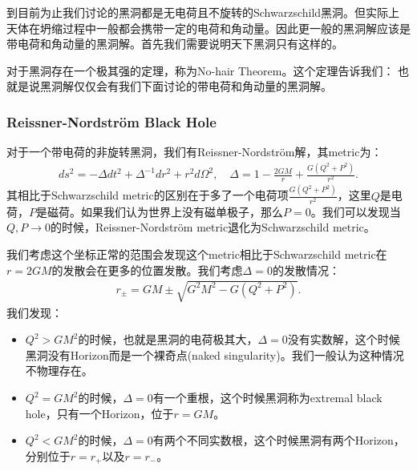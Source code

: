 到目前为止我们讨论的黑洞都是无电荷且不旋转的Schwarzschild黑洞。但实际上天体在坍缩过程中一般都会携带一定的电荷和角动量。因此更一般的黑洞解应该是带电荷和角动量的黑洞解。首先我们需要说明天下黑洞只有这样的。

\bigskip
{}

对于黑洞存在一个极其强的定理，称为No-hair Theorem。这个定理告诉我们：
也就是说黑洞解仅仅会有我们下面讨论的带电荷和角动量的黑洞解。

\subsubsection{Reissner-Nordström Black Hole}

\bigskip
{}

对于一个带电荷的非旋转黑洞，我们有Reissner-Nordström解，其metric为：
\begin{align}
  ds^2=-\Delta
  dt^2+\Delta^{-1}dr^2+r^2d\Omega^2,\quad\Delta=1-\frac{2GM}{r}+\frac{G(Q^2+P^2)}{r^2}.
\end{align}
其相比于Schwarzschild metric的区别在于多了一个电荷项$ \frac{G(Q^2+P^2)}{r^2} $，这里$ Q
$是电荷，$ P $是磁荷。如果我们认为世界上没有磁单极子，那么$ P=0 $。我们可以发现当$ Q,P \to 0
$的时候，Reissner-Nordström metric退化为Schwarzschild metric。

\bigskip
{}

我们考虑这个坐标正常的范围会发现这个metric相比于Schwarzschild metric在$ r = 2GM
$的发散会在更多的位置发散。我们考虑$ \Delta = 0 $的发散情况：
\begin{align}
  r_\pm=GM\pm\sqrt{G^2M^2-G(Q^2+P^2)}.
\end{align}
我们发现：
\begin{itemize}
  \item $ Q^2 > GM^2 $的时候，也就是黑洞的电荷极其大，$ \Delta = 0
    $没有实数解，这个时候黑洞没有Horizon而是一个裸奇点(naked singularity)。我们一般认为这种情况不物理存在。
  \item $ Q^2 = GM^2 $的时候，$ \Delta = 0 $有一个重根，这个时候黑洞称为extremal black
    hole，只有一个Horizon，位于$ r = GM $。
  \item $ Q^2 < GM^2 $的时候，$ \Delta = 0
    $有两个不同实数根，这个时候黑洞有两个Horizon，分别位于$ r = r_+ $以及$ r = r_- $。
\end{itemize}

